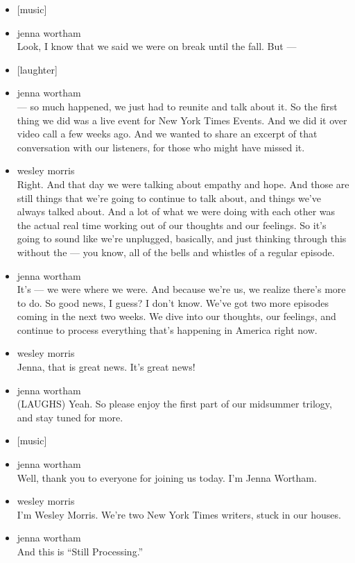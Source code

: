 \begin{itemize}
\item
  {[}music{]}
\item
  jenna wortham\\
  Look, I know that we said we were on break until the fall. But ---
\item
  {[}laughter{]}
\item
  jenna wortham\\
  --- so much happened, we just had to reunite and talk about it. So the
  first thing we did was a live event for New York Times Events. And we
  did it over video call a few weeks ago. And we wanted to share an
  excerpt of that conversation with our listeners, for those who might
  have missed it.
\item
  wesley morris\\
  Right. And that day we were talking about empathy and hope. And those
  are still things that we're going to continue to talk about, and
  things we've always talked about. And a lot of what we were doing with
  each other was the actual real time working out of our thoughts and
  our feelings. So it's going to sound like we're unplugged, basically,
  and just thinking through this without the --- you know, all of the
  bells and whistles of a regular episode.
\item
  jenna wortham\\
  It's --- we were where we were. And because we're us, we realize
  there's more to do. So good news, I guess? I don't know. We've got two
  more episodes coming in the next two weeks. We dive into our thoughts,
  our feelings, and continue to process everything that's happening in
  America right now.
\item
  wesley morris\\
  Jenna, that is great news. It's great news!
\item
  jenna wortham\\
  (LAUGHS) Yeah. So please enjoy the first part of our midsummer
  trilogy, and stay tuned for more.
\item
  {[}music{]}
\item
  jenna wortham\\
  Well, thank you to everyone for joining us today. I'm Jenna Wortham.
\item
  wesley morris\\
  I'm Wesley Morris. We're two New York Times writers, stuck in our
  houses.
\item
  jenna wortham\\
  And this is ``Still Processing.''
\end{itemize}


